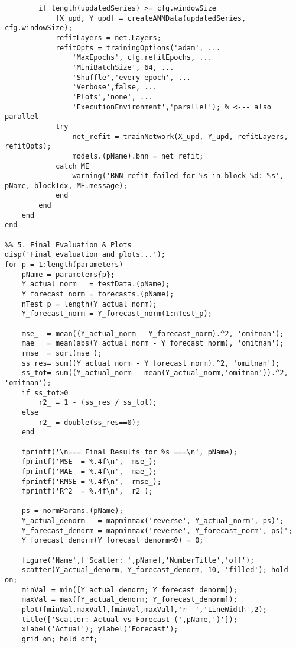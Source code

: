 \begin{verbatim}
        if length(updatedSeries) >= cfg.windowSize
            [X_upd, Y_upd] = createANNData(updatedSeries, cfg.windowSize);
            refitLayers = net.Layers;
            refitOpts = trainingOptions('adam', ...
                'MaxEpochs', cfg.refitEpochs, ...
                'MiniBatchSize', 64, ...
                'Shuffle','every-epoch', ...
                'Verbose',false, ...
                'Plots','none', ...
                'ExecutionEnvironment','parallel'); % <--- also parallel
            try
                net_refit = trainNetwork(X_upd, Y_upd, refitLayers, refitOpts);
                models.(pName).bnn = net_refit;
            catch ME
                warning('BNN refit failed for %s in block %d: %s', pName, blockIdx, ME.message);
            end
        end
    end
end

%% 5. Final Evaluation & Plots
disp('Final evaluation and plots...');
for p = 1:length(parameters)
    pName = parameters{p};
    Y_actual_norm   = testData.(pName);
    Y_forecast_norm = forecasts.(pName);
    nTest_p = length(Y_actual_norm);
    Y_forecast_norm = Y_forecast_norm(1:nTest_p);
    
    mse_  = mean((Y_actual_norm - Y_forecast_norm).^2, 'omitnan');
    mae_  = mean(abs(Y_actual_norm - Y_forecast_norm), 'omitnan');
    rmse_ = sqrt(mse_);
    ss_res= sum((Y_actual_norm - Y_forecast_norm).^2, 'omitnan');
    ss_tot= sum((Y_actual_norm - mean(Y_actual_norm,'omitnan')).^2, 'omitnan');
    if ss_tot>0
        r2_ = 1 - (ss_res / ss_tot);
    else
        r2_ = double(ss_res==0);
    end
    
    fprintf('\n=== Final Results for %s ===\n', pName);
    fprintf('MSE  = %.4f\n',  mse_);
    fprintf('MAE  = %.4f\n',  mae_);
    fprintf('RMSE = %.4f\n',  rmse_);
    fprintf('R^2  = %.4f\n',  r2_);
    
    ps = normParams.(pName);
    Y_actual_denorm   = mapminmax('reverse', Y_actual_norm', ps)';
    Y_forecast_denorm = mapminmax('reverse', Y_forecast_norm', ps)';
    Y_forecast_denorm(Y_forecast_denorm<0) = 0;
    
    figure('Name',['Scatter: ',pName],'NumberTitle','off');
    scatter(Y_actual_denorm, Y_forecast_denorm, 10, 'filled'); hold on;
    minVal = min([Y_actual_denorm; Y_forecast_denorm]);
    maxVal = max([Y_actual_denorm; Y_forecast_denorm]);
    plot([minVal,maxVal],[minVal,maxVal],'r--','LineWidth',2);
    title(['Scatter: Actual vs Forecast (',pName,')']);
    xlabel('Actual'); ylabel('Forecast');
    grid on; hold off;
    

\end{verbatim}
